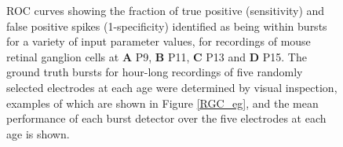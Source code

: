 \documentclass[12pt, titlepage]{article}
\begin{document}
		\begin{figure}[h]
			\centering
			\caption{ROC curves showing the fraction of true positive (sensitivity) and false positive spikes (1-specificity) identified as being within bursts for a variety of input parameter values, for recordings of mouse retinal ganglion cells at \textbf{A} P9, \textbf{B} P11,  \textbf{C} P13 and \textbf{D} P15. The ground truth bursts for hour-long recordings of five randomly selected electrodes at each age were determined by visual inspection, examples of which are shown in Figure \ref{RGC_eg}, and the mean performance of each burst detector over the five electrodes at each age is shown.}
			\label{ROC}
		\end{figure}  
\end{document}
